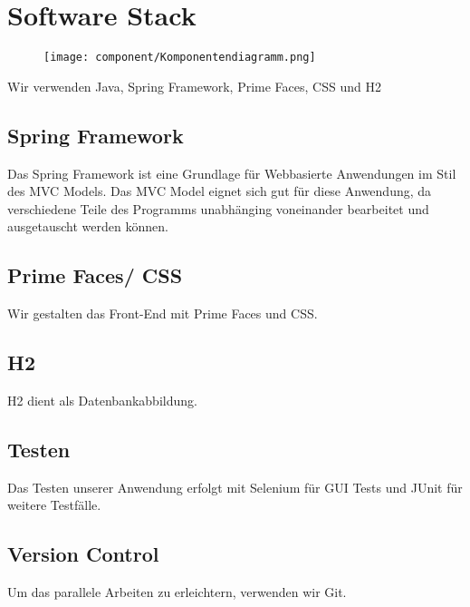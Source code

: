 \newpage
\section{Software Stack}

\begin{figure}[ht!]
\texttt{[image: component/Komponentendiagramm.png]}
\end{figure}
\newpage
Wir verwenden Java, Spring Framework, Prime Faces, CSS und H2

\subsection{Spring Framework}
Das Spring Framework ist eine Grundlage für Webbasierte Anwendungen im Stil des MVC Models. Das MVC Model eignet sich gut für diese Anwendung, da verschiedene Teile des Programms unabhänging voneinander bearbeitet und ausgetauscht werden können.

\subsection{Prime Faces/ CSS}
Wir gestalten das Front-End mit Prime Faces und CSS.

\subsection{H2}
H2 dient als Datenbankabbildung.

\subsection{Testen}
Das Testen unserer Anwendung erfolgt mit Selenium für GUI Tests und JUnit für weitere Testfälle.

\subsection{Version Control}
Um das parallele Arbeiten zu erleichtern, verwenden wir Git.